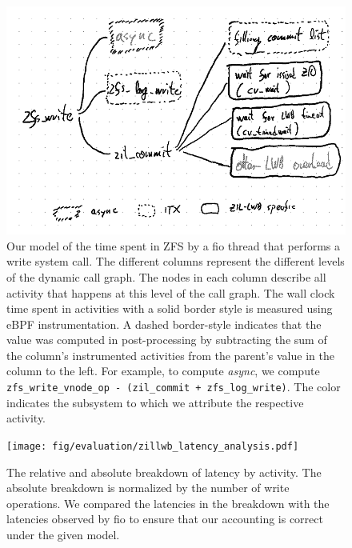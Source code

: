 \documentclass[12pt,a4paper,twoside]{book}
\begin{document}
{\begin{figure}[H]
    \centering
    \includegraphics{fig/zil_lwb_latency_analysis__breakdown}
    \caption{Our model of the time spent in ZFS by a fio thread that performs a write system call.
    The different columns represent the different levels of the dynamic call graph.
    The nodes in each column describe all activity that happens at this level of the call graph.
    The wall clock time spent in activities with a solid border style is measured using eBPF instrumentation.
    A dashed border-style indicates that the value was computed in post-processing by subtracting the sum of the column's instrumented activities from the parent's value in the column to the left.
    For example, to compute \textit{async}, we compute \lstinline{zfs_write_vnode_op - (zil_commit + zfs_log_write)}.
    The color indicates the subsystem to which we attribute the respective activity.
    }
    \label{fig:lwbanalysis:breakdown_model}
\end{figure}

\begin{figure}[H]
    \centering
    \texttt{[image: fig/evaluation/zillwb\_latency\_analysis.pdf]}
    \caption{The relative and absolute breakdown of latency by activity.
    The absolute breakdown is normalized by the number of write operations.
    We compared the latencies in the breakdown with the latencies observed by fio to ensure that our accounting is correct under the given model.
    }
    \label{fig:lwbanalysis:breakdown_charts}
\end{figure}

}
\end{document}

